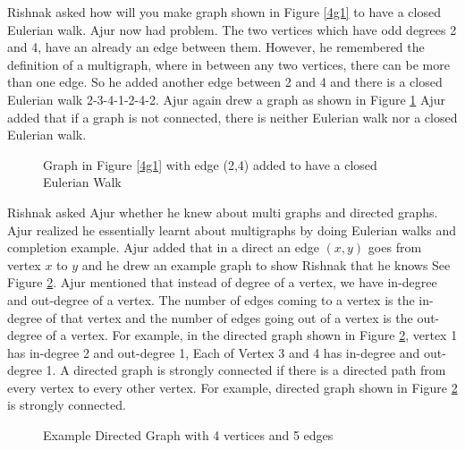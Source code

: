 Rishnak asked how will you make graph shown in Figure \ref{4g1} to have a closed Eulerian walk. Ajur now had problem. The two vertices which have odd degrees 2 and 4, have an already an edge between them. However, he remembered the definition of a multigraph, where in between any two vertices, there can be more than one edge. So he added another edge between 2 and 4 and there is a closed Eulerian walk 2-3-4-1-2-4-2. Ajur again drew a graph as shown in Figure \ref{4g155}
Ajur added that if a graph is not connected, there is neither Eulerian walk nor a closed Eulerian walk.
\begin{figure}
\begin{center}
\caption{ Graph in Figure \ref{4g1} with edge (2,4) added to have a closed Eulerian Walk}\label{4g155}
\end{center}
\end{figure}

\vspace{3in}
Rishnak asked Ajur whether he knew about multi graphs and directed graphs. Ajur realized he essentially learnt about multigraphs  by doing Eulerian walks and completion  example. Ajur added that in a direct an edge $(x,y)$ goes from vertex $x$ to $y$ and he drew an example graph to show Rishnak that he knows See Figure \ref{4g5}. Ajur mentioned that instead of degree of a vertex, we have in-degree and out-degree of a vertex. The number of edges coming to a vertex is the in-degree of that vertex and the number of edges going out of a vertex is the out-degree of a vertex. For example, in the directed graph shown in Figure \ref{4g5}, vertex 1 has in-degree 2 and out-degree 1, Each of Vertex 3 and 4 has in-degree  and out-degree 1. A directed graph is strongly connected if there is a directed path from every vertex to every other vertex. For example, directed graph shown in Figure \ref{4g5} is strongly connected. 
\begin{figure}
\begin{center}
\caption{ Example Directed Graph with 4 vertices and 5 edges}\label{4g5}
\end{center}
\end{figure}

